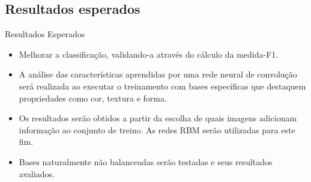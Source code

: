 \documentclass{beamer}
\begin{document}
\subsection{Resultados esperados}
\begin{frame}{Resultados Esperados}

\begin{itemize}
\item Melhorar a classificação, validando-a através do cálculo da medida-F1. 
\item A análise das características aprendidas por uma rede neural de convolução será realizada ao executar o treinamento com bases específicas que destaquem propriedades como cor, textura e forma. 
\item Os resultados serão obtidos a partir da escolha de quais imagens adicionam informação ao conjunto de treino. As redes RBM serão utilizadas para este fim. 
\item Bases naturalmente não balanceadas serão testadas e seus resultados avaliados.
\end{itemize}




\end{frame}
\end{document}
